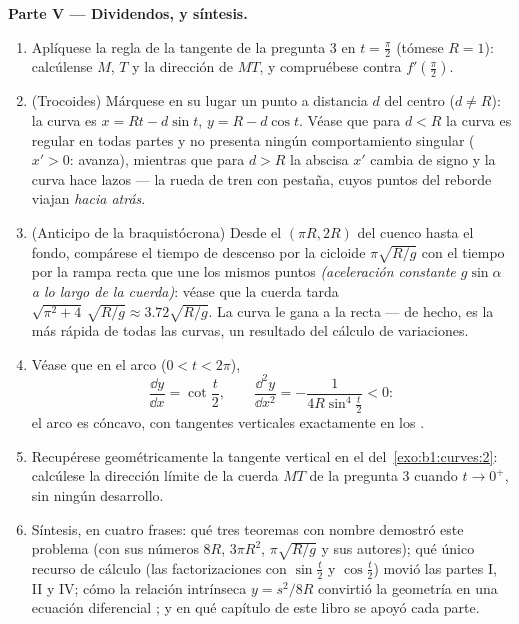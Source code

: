 \begin{problem}
\medskip
\noindent\textbf{Parte V --- Dividendos, y síntesis.}
\begin{enumerate}[resume]
  \item Aplíquese la regla de la tangente de la pregunta 3 en
        $t = \frac\pi2$ (tómese $R = 1$): calcúlense $M$, $T$ y la
        dirección de $MT$, y compruébese contra $f'(\frac\pi2)$.
  \item (Trocoides) Márquese en su lugar un punto a distancia $d$
        del centro ($d \neq R$): la curva es
        $x = Rt - d\sin t$, $y = R - d\cos t$. Véase que para
        $d < R$ la curva es regular en todas partes y no presenta
        ningún comportamiento singular ($x' > 0$: avanza),
        mientras que para $d > R$ la abscisa $x'$ cambia de signo y
        la curva hace lazos --- la rueda de tren con pestaña, cuyos
        puntos del reborde viajan \emph{hacia atrás}.
  \item (Anticipo de la braquistócrona) Desde el
         $(\pi R, 2R)$ del cuenco hasta el fondo,
        compárese el tiempo de descenso por la cicloide
        $\pi\sqrt{R/g}$ con el tiempo por la rampa recta que une los
        mismos puntos \emph{(aceleración constante $g\sin\alpha$ a
        lo largo de la cuerda)}: véase que la cuerda tarda
        $\sqrt{\pi^2 + 4}\,\sqrt{R/g} \approx 3.72\sqrt{R/g}$. La
        curva le gana a la recta --- de hecho, es la más rápida de
        todas las curvas, un resultado del cálculo de variaciones.
  \item Véase que en el arco ($0 < t < 2\pi$),
        \[
        \frac{\dd y}{\dd x} = \cot\frac t2,
        \qquad
        \frac{\dd^2 y}{\dd x^2} =
        -\frac{1}{4R\sin^4\frac t2} < 0 :
        \]
        el arco es cóncavo, con tangentes verticales exactamente en
        los .
  \item Recupérese geométricamente la tangente vertical en el
         del~\cref{exo:b1:curves:2}: calcúlese la
        dirección límite de la cuerda $MT$ de la pregunta 3 cuando
        $t \to 0^{+}$, sin ningún desarrollo.
  \item Síntesis, en cuatro frases: qué tres teoremas con nombre
        demostró este problema (con sus números $8R$,
        $3\pi R^2$, $\pi\sqrt{R/g}$ y sus autores); qué único
        recurso de cálculo (las factorizaciones con $\sin\frac t2$
        y $\cos\frac t2$) movió las partes I, II y IV; cómo la
        relación intrínseca $y = s^2/8R$ convirtió la geometría en
        una ecuación diferencial ; y en qué capítulo de este
        libro se apoyó cada parte.
\end{enumerate}
\end{problem}
